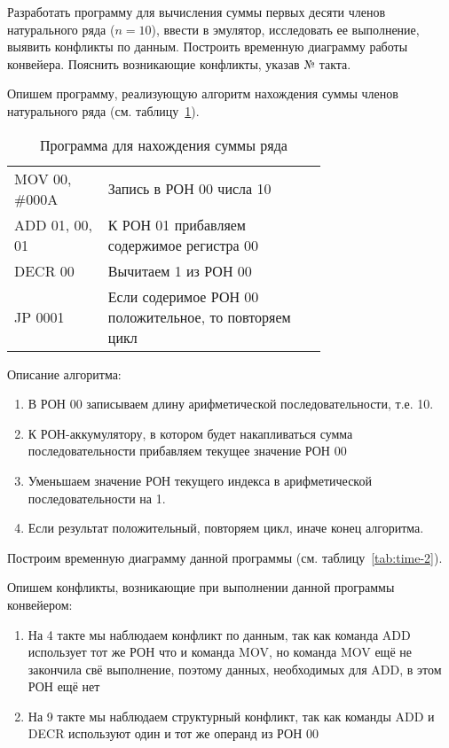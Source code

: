 \documentclass[a4paper,14pt]{extarticle}
\begin{document}
\begin{problem}
	Разработать программу для вычисления суммы первых десяти членов натурального ряда ($n=10$),
	ввести в эмулятор, исследовать ее выполнение, выявить конфликты по
	данным. Построить временную диаграмму работы конвейера. Пояснить
	возникающие конфликты, указав № такта.

	\nonum Опишем программу, реализующую алгоритм нахождения суммы членов натурального ряда (см. таблицу~\ref{tab:prog-2}).
	\newpage
	\begin{table}[htbp]

		\begin{tabular}{|l|p{0.7\linewidth}|}
			\hline
			\centerboldcell{Команда} & \centerboldcell{Описание} \\ \hline\hline
			MOV 00, \#000A & Запись в РОН 00 числа 10 \\ \hline
			ADD 01, 00, 01 & К РОН 01 прибавляем содержимое регистра 00 \\ \hline
			DECR 00 & Вычитаем 1 из РОН 00 \\ \hline
			JP 0001 & Если содеримое РОН 00 положительное, то повторяем цикл \\ \hline
		\end{tabular}
		\caption{Программа для нахождения суммы ряда}
		\label{tab:prog-2}
	\end{table}


Описание алгоритма:
\begin{enumerate}
	\item В РОН 00 записываем длину арифметической последовательности, т.е. 10.
	\item К РОН-аккумулятору, в котором будет накапливаться сумма последовательности прибавляем текущее значение РОН 00
	\item Уменьшаем значение РОН текущего индекса в арифметической последовательности на 1.
	\item Если результат положительный, повторяем цикл, иначе конец алгоритма.
\end{enumerate}

Построим временную диаграмму данной программы (см. таблицу~\ref{tab:time-2}).

Опишем конфликты, возникающие при выполнении данной программы конвейером:
\begin{enumerate}
	\item На 4 такте мы наблюдаем конфликт по данным, так как команда ADD использует тот же РОН что и команда MOV, но команда MOV ещё не закончила свё выполнение, поэтому данных, необходимых для ADD, в этом РОН ещё нет
	\item На 9 такте мы наблюдаем структурный конфликт, так как команды ADD и DECR используют один и тот же операнд из РОН 00
\end{enumerate}

\end{problem}
\end{document}
